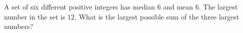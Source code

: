 A set of six different positive integers has median $6$ and mean $6$. The largest number in the set is $12$. What is the largest possible sum of the three largest numbers?
